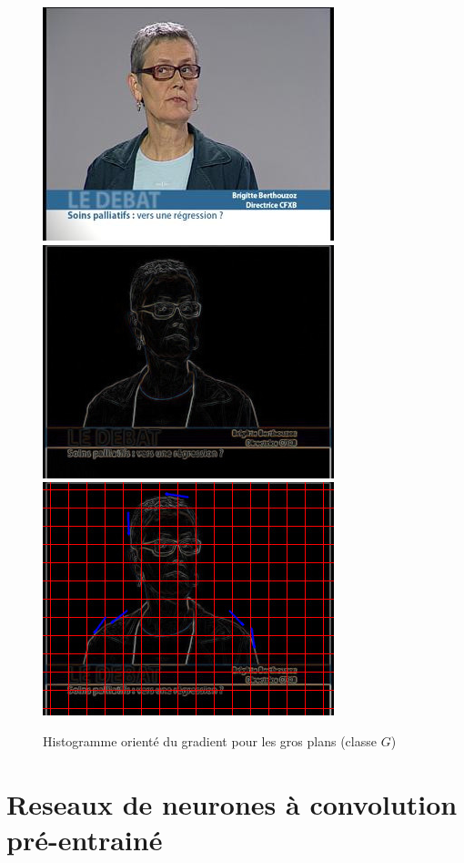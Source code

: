 \documentclass{book}
\begin{document}
\begin{figure}[H]
\begin{center}
\includegraphics[scale=0.3]{hog_exemple2.jpg}
\includegraphics[scale=0.3]{hog_exemple2_contour.jpg}
\includegraphics[scale=0.3]{hog_exemple2_gradient.jpg}
\end{center}
\caption{Histogramme orienté du gradient pour les gros plans (classe $G$)}
\label{hog_classeG}
\end{figure}

\section{Reseaux de neurones à convolution pré-entrainé}
\end{document}
